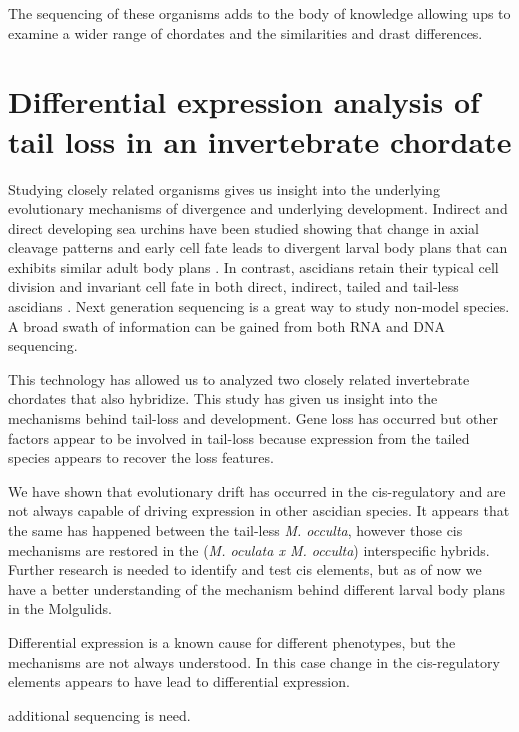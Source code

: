 The sequencing of these organisms adds to the body of knowledge allowing ups to examine a wider range of chordates and the similarities and drast differences. 

\section{Differential expression analysis of tail loss in an invertebrate chordate}
Studying closely related organisms gives us insight into the underlying evolutionary mechanisms of divergence and underlying development. Indirect and direct developing sea urchins have been studied showing that change in axial cleavage patterns and early cell fate leads to divergent larval body plans that can exhibits similar adult body plans \cite{wray_evolutionary_1989,henry_evolutionary_1990}. In contrast, ascidians retain their typical cell division and invariant cell fate in both direct, indirect, tailed and tail-less ascidians \cite{jeffery_evolutionary_1991,maliska_molgula_2010}. Next generation sequencing is a great way to study non-model species. A broad swath of information can be gained from both RNA and DNA sequencing. 

This technology has allowed us to analyzed two closely related invertebrate chordates that also hybridize. This study has given us insight into the mechanisms behind tail-loss and development. Gene loss has occurred but other factors appear to be involved in tail-loss because expression from the tailed species appears to recover the loss features. 
  
We have shown that evolutionary drift has occurred in the cis-regulatory and are not always capable of driving expression in other ascidian species. It appears that the same has happened between the tail-less \textit{M. occulta}, however those cis mechanisms are restored in the (\textit{M. oculata x M. occulta}) interspecific hybrids. Further research is needed to identify and test cis elements, but as of now we have a better understanding of the mechanism behind different larval body plans in the Molgulids. 

Differential expression is a known cause for different phenotypes, but the mechanisms are not always understood. In this case change in the cis-regulatory elements appears to have lead to differential expression.

additional sequencing is need.


